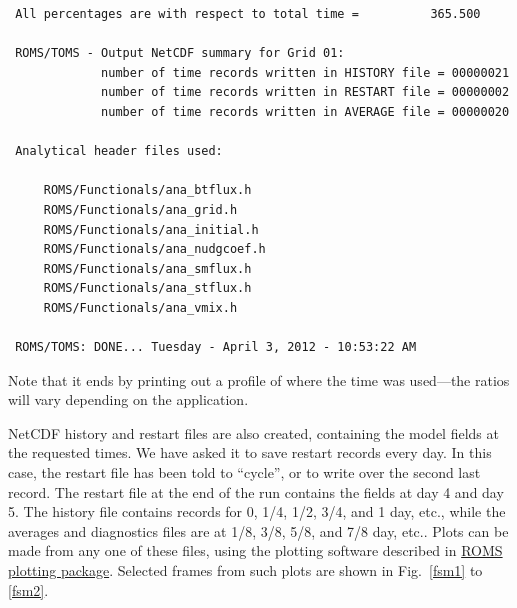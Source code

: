 \begin{verbatim}
 All percentages are with respect to total time =          365.500

 ROMS/TOMS - Output NetCDF summary for Grid 01:
             number of time records written in HISTORY file = 00000021
             number of time records written in RESTART file = 00000002
             number of time records written in AVERAGE file = 00000020

 Analytical header files used:

     ROMS/Functionals/ana_btflux.h
     ROMS/Functionals/ana_grid.h
     ROMS/Functionals/ana_initial.h
     ROMS/Functionals/ana_nudgcoef.h
     ROMS/Functionals/ana_smflux.h
     ROMS/Functionals/ana_stflux.h
     ROMS/Functionals/ana_vmix.h

 ROMS/TOMS: DONE... Tuesday - April 3, 2012 - 10:53:22 AM
\end{verbatim}
Note that it ends by printing out a profile of where the time was
used---the ratios will vary depending on the application.

NetCDF history and restart files are also created, containing
the model fields at the requested times. We have asked it to save 
restart records every day. In this case, the restart
file has been told to ``cycle'', or to write over the second last
record. The restart file at the end of the run contains the fields at
day 4 and day 5. The history file contains records for 0, 1/4, 1/2,
3/4, and 1 day, etc., while the averages and diagnostics files are
at 1/8, 3/8, 5/8, and 7/8 day, etc..
Plots can be made from any one of these files, using the plotting
software described in
\href{https://www.myroms.org/wiki/index.php/Plotting_Package_Installation}{ROMS
plotting package}. Selected frames from
such plots are shown in Fig.\ \ref{fsm1} to \ref{fsm2}.

